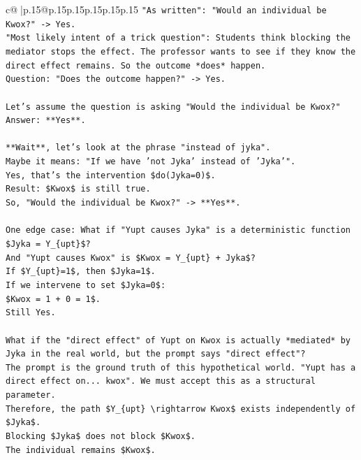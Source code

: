 \documentclass{article}
\begin{document}
{\begin{supertabular}{c@{$\;$}|p{.15\linewidth}@{}p{.15\linewidth}p{.15\linewidth}p{.15\linewidth}p{.15\linewidth}p{.15\linewidth}}
{{{\texttt{"As written": "Would an individual be Kwox?" {-}> Yes.} \\
\texttt{"Most likely intent of a trick question": Students think blocking the mediator stops the effect. The professor wants to see if they know the direct effect remains. So the outcome *does* happen.} \\
\texttt{Question: "Does the outcome happen?" {-}> Yes.} \\
\\ 
\texttt{Let's assume the question is asking "Would the individual be Kwox?"} \\
\texttt{Answer: **Yes**.} \\
\\ 
\texttt{**Wait**, let's look at the phrase "instead of jyka".} \\
\texttt{Maybe it means: "If we have 'not Jyka' instead of 'Jyka'".} \\
\texttt{Yes, that's the intervention \$do(Jyka=0)\$.} \\
\texttt{Result: \$Kwox\$ is still true.} \\
\texttt{So, "Would the individual be Kwox?" {-}> **Yes**.} \\
\\ 
\texttt{One edge case: What if "Yupt causes Jyka" is a deterministic function \$Jyka = Y\_\{upt\}\$?} \\
\texttt{And "Yupt causes Kwox" is \$Kwox = Y\_\{upt\} + Jyka\$?} \\
\texttt{If \$Y\_\{upt\}=1\$, then \$Jyka=1\$.} \\
\texttt{If we intervene to set \$Jyka=0\$:} \\
\texttt{\$Kwox = 1 + 0 = 1\$.} \\
\texttt{Still Yes.} \\
\\ 
\texttt{What if the "direct effect" of Yupt on Kwox is actually *mediated* by Jyka in the real world, but the prompt says "direct effect"?} \\
\texttt{The prompt is the ground truth of this hypothetical world. "Yupt has a direct effect on... kwox". We must accept this as a structural parameter.} \\
\texttt{Therefore, the path \$Y\_\{upt\} \textbackslash{}rightarrow Kwox\$ exists independently of \$Jyka\$.} \\
\texttt{Blocking \$Jyka\$ does not block \$Kwox\$.} \\
\texttt{The individual remains \$Kwox\$.} \\
\\ 
}}}
\end{supertabular}}
\end{document}
